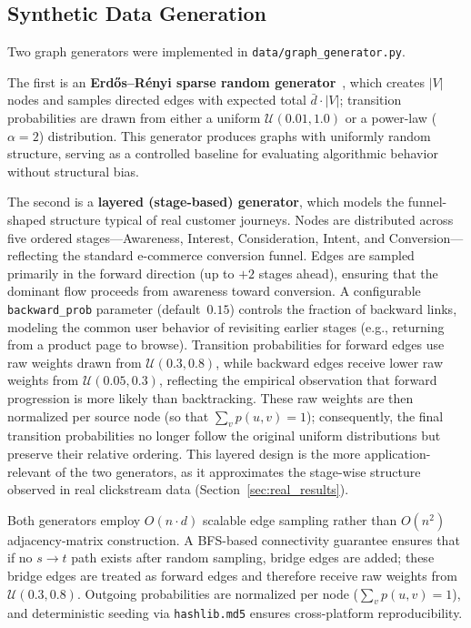 \subsection{Synthetic Data Generation}

Two graph generators were implemented in \texttt{data/graph\_generator.py}.

The first is an \textbf{Erd\H{o}s--R\'{e}nyi sparse random generator}~\citep{erdosrenyi1960}, which creates $|V|$ nodes and samples directed edges with expected total $\bar{d} \cdot |V|$; transition probabilities are drawn from either a uniform $\mathcal{U}(0.01, 1.0)$ or a power-law ($\alpha=2$) distribution. This generator produces graphs with uniformly random structure, serving as a controlled baseline for evaluating algorithmic behavior without structural bias.

The second is a \textbf{layered (stage-based) generator}, which models the funnel-shaped structure typical of real customer journeys. Nodes are distributed across five ordered stages---Awareness, Interest, Consideration, Intent, and Conversion---reflecting the standard e-commerce conversion funnel. Edges are sampled primarily in the forward direction (up to $+2$ stages ahead), ensuring that the dominant flow proceeds from awareness toward conversion. A configurable \texttt{backward\_prob} parameter (default~$0.15$) controls the fraction of backward links, modeling the common user behavior of revisiting earlier stages (e.g., returning from a product page to browse). Transition probabilities for forward edges use raw weights drawn from $\mathcal{U}(0.3, 0.8)$, while backward edges receive lower raw weights from $\mathcal{U}(0.05, 0.3)$, reflecting the empirical observation that forward progression is more likely than backtracking. These raw weights are then normalized per source node (so that $\sum_v p(u,v) = 1$); consequently, the final transition probabilities no longer follow the original uniform distributions but preserve their relative ordering. This layered design is the more application-relevant of the two generators, as it approximates the stage-wise structure observed in real clickstream data (Section~\ref{sec:real_results}).

Both generators employ $O(n \cdot d)$ scalable edge sampling rather than $O(n^2)$ adjacency-matrix construction. A BFS-based connectivity guarantee ensures that if no $s \to t$ path exists after random sampling, bridge edges are added; these bridge edges are treated as forward edges and therefore receive raw weights from $\mathcal{U}(0.3, 0.8)$. Outgoing probabilities are normalized per node ($\sum_v p(u,v) = 1$), and deterministic seeding via \texttt{hashlib.md5} ensures cross-platform reproducibility.


